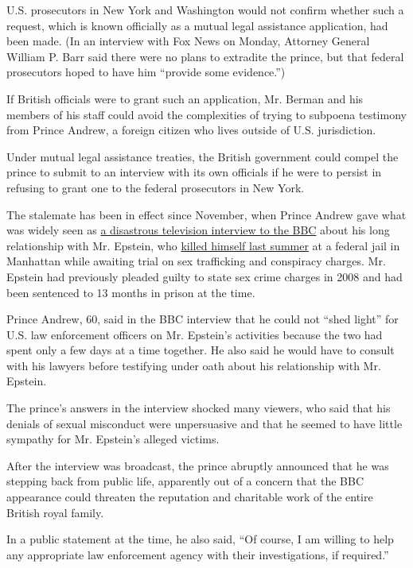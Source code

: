 U.S. prosecutors in New York and Washington would not confirm whether
such a request, which is known officially as a mutual legal assistance
application, had been made. (In an interview with Fox News on Monday,
Attorney General William P. Barr said there were no plans to extradite
the prince, but that federal prosecutors hoped to have him ``provide
some evidence.'')

If British officials were to grant such an application, Mr. Berman and
his members of his staff could avoid the complexities of trying to
subpoena testimony from Prince Andrew, a foreign citizen who lives
outside of U.S. jurisdiction.

Under mutual legal assistance treaties, the British government could
compel the prince to submit to an interview with its own officials if he
were to persist in refusing to grant one to the federal prosecutors in
New York.

The stalemate has been in effect since November, when Prince Andrew gave
what was widely seen as
\href{https://www.nytimes.com/2019/11/20/world/europe/prince-andrew-quits-epstein.html}{a
disastrous television interview to the BBC} about his long relationship
with Mr. Epstein, who
\href{https://www.nytimes.com/2019/12/02/world/europe/prince-andrews-Virginia-Roberts-Giuffre-bbc.html}{killed
himself last summer} at a federal jail in Manhattan while awaiting trial
on sex trafficking and conspiracy charges. Mr. Epstein had previously
pleaded guilty to state sex crime charges in 2008 and had been sentenced
to 13 months in prison at the time.

Prince Andrew, 60, said in the BBC interview that he could not ``shed
light'' for U.S. law enforcement officers on Mr. Epstein's activities
because the two had spent only a few days at a time together. He also
said he would have to consult with his lawyers before testifying under
oath about his relationship with Mr. Epstein.

The prince's answers in the interview shocked many viewers, who said
that his denials of sexual misconduct were unpersuasive and that he
seemed to have little sympathy for Mr. Epstein's alleged victims.

After the interview was broadcast, the prince abruptly announced that he
was stepping back from public life, apparently out of a concern that the
BBC appearance could threaten the reputation and charitable work of the
entire British royal family.

In a public statement at the time, he also said, ``Of course, I am
willing to help any appropriate law enforcement agency with their
investigations, if required.''

